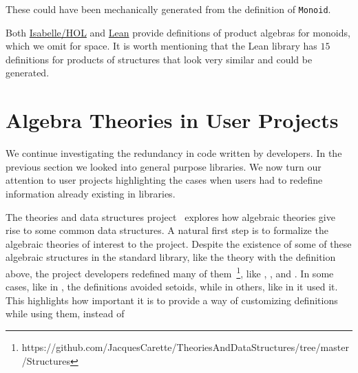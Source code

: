 These could have been mechanically generated from the definition
of \verb|Monoid|.

Both 
\href{https://isabelle.in.tum.de/website-Isabelle2019/dist/library/HOL/HOL-Algebra/Group.html}
{Isabelle/HOL}
and 
\href{https://github.com/leanprover-community/mathlib/blob/3c58f160fd51ebf989138ed7c8981f821f08f860/src/algebra/pi_instances.lean}
{Lean}
provide definitions of product algebras for monoids, which we omit for space.
It is worth mentioning that the Lean library has $15$ definitions for products
of structures that look very similar and could be generated. 


\section{Algebra Theories in User Projects}
\label{sec:redun:user_projects}

We continue investigating the redundancy in code written by developers. In the previous section we looked into general purpose libraries. We now turn our attention to user projects highlighting the cases when users had to redefine information already existing in libraries. 

The theories and data structures project~\cite{theoriesAndDts} explores how algebraic theories give rise to some common data structures. A natural first step is to formalize the algebraic theories of interest to the project. Despite the existence of some of these algebraic structures in the standard library, like the  theory with the definition above, the project developers redefined many of them~\footnote{https://github.com/JacquesCarette/TheoriesAndDataStructures/tree/master/Structures}, like , , and . In some cases, like in , the definitions avoided setoids, while in others, like in  it used it. This highlights how important it is to provide a way of customizing definitions while using them, instead of 


